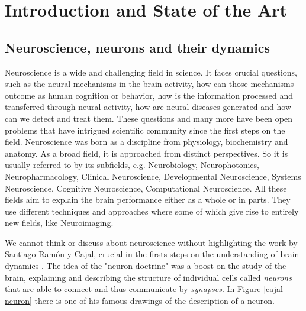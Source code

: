 \chapter{Introduction and State of the Art}
\label{c-intro}

\section{Neuroscience, neurons and their dynamics}
Neuroscience is a wide and challenging field in science. It faces crucial questions, such as the neural mechanisms in the brain activity, how can those mechanisms outcome as human cognition or behavior, how is the information processed and transferred through neural activity, how are neural diseases generated and how can we detect and treat them. 
These questions and many more have been open problems that have intrigued scientific community since the first steps on the field. Neuroscience was born as a discipline from physiology, biochemistry and anatomy. As a broad field, it is approached from distinct perspectives. So it is usually referred to by its subfields, e.g. Neurobiology, Neurophotonics, Neuropharmacology, Clinical Neuroscience, Developmental Neuroscience, Systems Neuroscience, Cognitive Neuroscience, Computational Neuroscience. All these fields aim to explain the brain performance either as a whole or in parts. They use different techniques and approaches where some of which give rise to entirely new fields, like Neuroimaging.

We cannot think or discuss about neuroscience without highlighting the work by Santiago Ramón y Cajal, crucial in the firsts steps on the understanding of brain dynamics \parencite{de_carlos_historical_2007,de_castro_editorial_2016,delgado-garcia_cajal_2015,de_castro_cajal_2019}. The idea of the "neuron doctrine" was a boost on the study of the brain, explaining and describing the structure of individual cells called \textit{neurons} that are able to connect and thus communicate by \textit{synapses}. In Figure \ref{cajal-neuron} there is one of his famous drawings of the description of a neuron.


